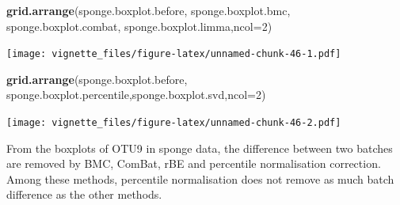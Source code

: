 \documentclass[]{book}
\newenvironment{Shaded}{\begin{snugshade}}{\end{snugshade}}
\newcommand{\KeywordTok}[1]{\textcolor[rgb]{0.13,0.29,0.53}{\textbf{#1}}}
\newcommand{\DataTypeTok}[1]{\textcolor[rgb]{0.13,0.29,0.53}{#1}}
\newcommand{\DecValTok}[1]{\textcolor[rgb]{0.00,0.00,0.81}{#1}}
\newcommand{\StringTok}[1]{\textcolor[rgb]{0.31,0.60,0.02}{#1}}
\newcommand{\OperatorTok}[1]{\textcolor[rgb]{0.81,0.36,0.00}{\textbf{#1}}}
\newcommand{\NormalTok}[1]{#1}
\begin{document}
\begin{Shaded}
\end{Shaded}

\begin{Shaded}
\begin{Highlighting}[]
\KeywordTok{grid.arrange}\NormalTok{(sponge.boxplot.before, sponge.boxplot.bmc, sponge.boxplot.combat, sponge.boxplot.limma,}\DataTypeTok{ncol=}\DecValTok{2}\NormalTok{)}
\end{Highlighting}
\end{Shaded}

\texttt{[image: vignette\_files/figure-latex/unnamed-chunk-46-1.pdf]}

\begin{Shaded}
\begin{Highlighting}[]
\KeywordTok{grid.arrange}\NormalTok{(sponge.boxplot.before, sponge.boxplot.percentile,sponge.boxplot.svd,}\DataTypeTok{ncol=}\DecValTok{2}\NormalTok{)}
\end{Highlighting}
\end{Shaded}

\texttt{[image: vignette\_files/figure-latex/unnamed-chunk-46-2.pdf]}

From the boxplots of OTU9 in sponge data, the difference between two
batches are removed by BMC, ComBat, rBE and percentile normalisation
correction. Among these methods, percentile normalisation does not
remove as much batch difference as the other methods.
\end{document}
